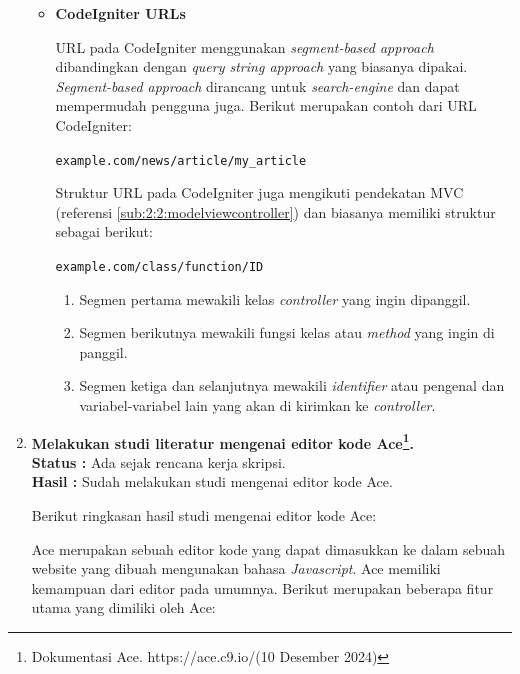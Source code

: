 \documentclass[a4paper,twoside]{article}
\begin{document}
\begin{enumerate}
\begin{itemize}
		      \item \textbf{CodeIgniter URLs}
		            \label{sub:2:2:codeigniterurls}

		            URL pada CodeIgniter menggunakan \textit{segment-based approach} dibandingkan dengan \textit{query string approach} yang biasanya dipakai. \textit{Segment-based approach} dirancang untuk \textit{search-engine} dan dapat mempermudah pengguna juga. Berikut merupakan contoh dari URL CodeIgniter:

		            \begin{center}
			            \verb|example.com/news/article/my_article|
		            \end{center}

		            Struktur URL pada CodeIgniter juga mengikuti pendekatan MVC (referensi \ref{sub:2:2:modelviewcontroller}) dan biasanya memiliki struktur sebagai berikut:

		            \begin{center}
			            \verb|example.com/class/function/ID|
		            \end{center}

		            \begin{enumerate}
			            \item Segmen pertama mewakili kelas \textit{controller} yang ingin dipanggil.
			            \item Segmen berikutnya mewakili fungsi kelas atau \textit{method} yang ingin di panggil.
			            \item Segmen ketiga dan selanjutnya mewakili \textit{identifier} atau pengenal dan variabel-variabel lain yang akan di kirimkan ke \textit{controller}.
		            \end{enumerate}
	      \end{itemize}

	\item \textbf{Melakukan studi literatur mengenai editor kode Ace\footnote{Dokumentasi Ace. https://ace.c9.io/(10 Desember 2024)}.} \\
	      {\bf Status :} Ada sejak rencana kerja skripsi.\\
	      {\bf Hasil :} Sudah melakukan studi mengenai editor kode Ace.

	      Berikut ringkasan hasil studi mengenai editor kode Ace:

	      Ace merupakan sebuah editor kode yang dapat dimasukkan ke dalam sebuah website yang dibuah mengunakan bahasa \textit{Javascript}. Ace memiliki kemampuan dari editor pada umumnya. Berikut merupakan beberapa fitur utama yang dimiliki oleh Ace:


\end{enumerate}
\end{document}
